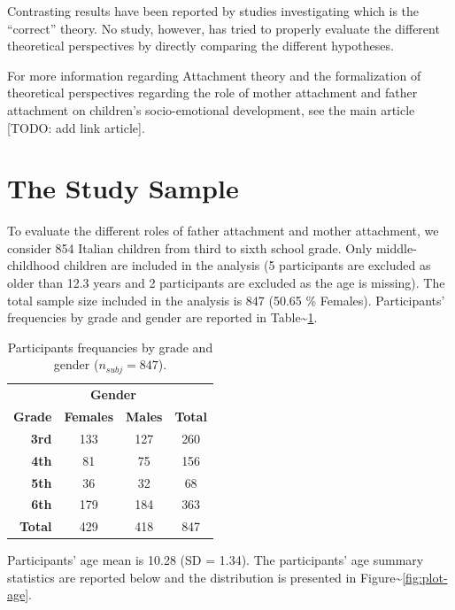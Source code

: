 \documentclass[
]{book}
\begin{document}
Contrasting results have been reported by studies investigating which is the ``correct'' theory. No study, however, has tried to properly evaluate the different theoretical perspectives by directly comparing the different hypotheses.

For more information regarding Attachment theory and the formalization of theoretical perspectives regarding the role of mother attachment and father attachment on children's socio-emotional development, see the main article {[}TODO: add link article{]}.

\hypertarget{the-study-sample}{%
\section{The Study Sample}\label{the-study-sample}}

To evaluate the different roles of father attachment and mother attachment, we consider 854 Italian children from third to sixth school grade. Only middle-childhood children are included in the analysis (5 participants are excluded as older than 12.3 years and 2 participants are excluded as the age is missing). The total sample size included in the analysis is 847 (50.65 \% Females). Participants' frequencies by grade and gender are reported in Table\textasciitilde\ref{tab:table-gender-grade}.

\begin{table}[!h]

\caption{\label{tab:table-gender-grade}Participants frequancies by grade and gender ($n_{subj} = 847$).}
\centering
\begin{tabular}[t]{>{}rccc}
\toprule
\multicolumn{1}{c}{\textbf{ }} & \multicolumn{2}{c}{\textbf{Gender}} & \multicolumn{1}{c}{\textbf{ }} \\
\cmidrule(l{3pt}r{3pt}){2-3}
\textbf{Grade} & \textbf{Females} & \textbf{Males} & \textbf{Total}\\
\midrule
\textbf{3rd} & 133 & 127 & 260\\
\textbf{4th} & 81 & 75 & 156\\
\textbf{5th} & 36 & 32 & 68\\
\textbf{6th} & 179 & 184 & 363\\
\textbf{Total} & 429 & 418 & 847\\
\bottomrule
\end{tabular}
\end{table}

Participants' age mean is 10.28 (SD = 1.34). The participants' age summary statistics are reported below and the distribution is presented in Figure\textasciitilde\ref{fig:plot-age}.
\end{document}
